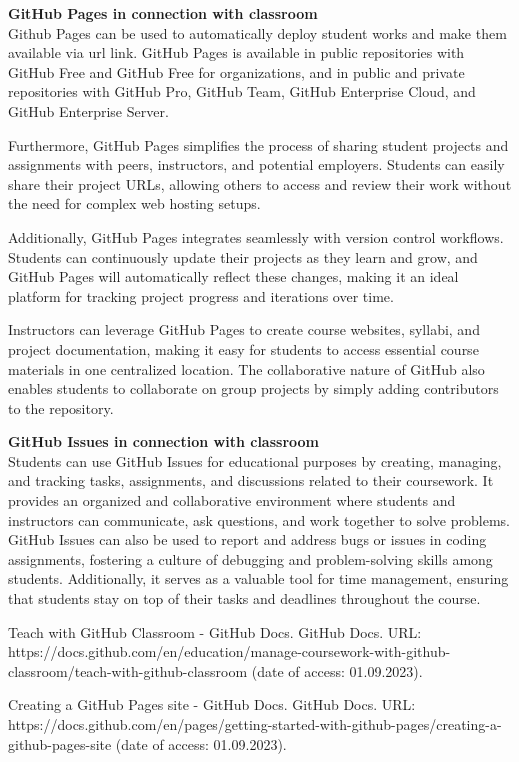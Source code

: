 \documentclass[a5paper, 10pt]{article}
\begin{document}
\textbf{GitHub Pages in connection with classroom} \\
Github Pages can be used to automatically deploy student works and make them available via url link. GitHub Pages is available in public repositories with GitHub Free and GitHub Free for organizations, and in public and private repositories with GitHub Pro, GitHub Team, GitHub Enterprise Cloud, and GitHub Enterprise Server. \cite{git_pages}

Furthermore, GitHub Pages simplifies the process of sharing student projects and assignments with peers, instructors, and potential employers. Students can easily share their project URLs, allowing others to access and review their work without the need for complex web hosting setups.

Additionally, GitHub Pages integrates seamlessly with version control workflows. Students can continuously update their projects as they learn and grow, and GitHub Pages will automatically reflect these changes, making it an ideal platform for tracking project progress and iterations over time.

Instructors can leverage GitHub Pages to create course websites, syllabi, and project documentation, making it easy for students to access essential course materials in one centralized location. The collaborative nature of GitHub also enables students to collaborate on group projects by simply adding contributors to the repository.

\textbf{GitHub Issues in connection with classroom} \\
Students can use GitHub Issues for educational purposes by creating, managing, and tracking tasks, assignments, and discussions related to their coursework. It provides an organized and collaborative environment where students and instructors can communicate, ask questions, and work together to solve problems. GitHub Issues can also be used to report and address bugs or issues in coding assignments, fostering a culture of debugging and problem-solving skills among students. Additionally, it serves as a valuable tool for time management, ensuring that students stay on top of their tasks and deadlines throughout the course.

\vspace{1cm}



\vfill


\begin{thebibliography}{99}
 Teach with GitHub Classroom - GitHub Docs. GitHub Docs. URL: https://docs.github.com/en/education/manage-coursework-with-github-classroom/teach-with-github-classroom (date of access: 01.09.2023).

 Creating a GitHub Pages site - GitHub Docs. GitHub Docs. URL: https://docs.github.com/en/pages/getting-started-with-github-pages/creating-a-github-pages-site (date of access: 01.09.2023).
\end{thebibliography}
\end{document}
